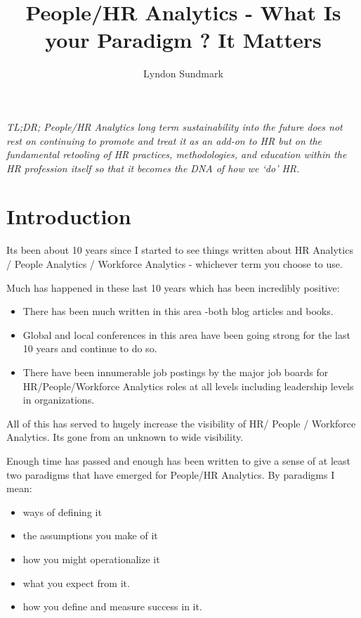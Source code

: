 \documentclass[12pt,letterpaper]{article}
\title{People/HR Analytics - What Is your Paradigm ? It Matters}
\author{Lyndon Sundmark}
\begin{document}
\maketitle

\emph{TL;DR; People/HR Analytics long term sustainability into the
future does not rest on continuing to promote and treat it as an add-on
to HR but on the fundamental retooling of HR practices, methodologies,
and education within the HR profession itself so that it becomes the DNA
of how we `do' HR.}

\section{Introduction}\label{introduction}

Its been about 10 years since I started to see things written about HR
Analytics / People Analytics / Workforce Analytics - whichever term you
choose to use.

Much has happened in these last 10 years which has been incredibly
positive:

\begin{itemize}
\item
  There has been much written in this area -both blog articles and
  books.
\item
  Global and local conferences in this area have been going strong for
  the last 10 years and continue to do so.
\item
  There have been innumerable job postings by the major job boards for
  HR/People/Workforce Analytics roles at all levels including leadership
  levels in organizations.
\end{itemize}

All of this has served to hugely increase the visibility of HR/ People /
Workforce Analytics. Its gone from an unknown to wide visibility.

Enough time has passed and enough has been written to give a sense of at
least two paradigms that have emerged for People/HR Analytics. By
paradigms I mean:

\begin{itemize}
\item
  ways of defining it
\item
  the assumptions you make of it
\item
  how you might operationalize it
\item
  what you expect from it.
\item
  how you define and measure success in it.
\end{itemize}
\end{document}
